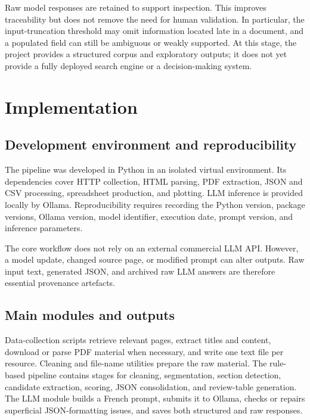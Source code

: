 Raw model responses are retained to support inspection. This improves
traceability but does not remove the need for human validation. In particular,
the input-truncation threshold may omit information located late in a document,
and a populated field can still be ambiguous or weakly supported. At this stage,
the project provides a structured corpus and exploratory outputs; it does not
yet provide a fully deployed search engine or a decision-making system.

\chapter{Implementation}

\section{Development environment and reproducibility}

The pipeline was developed in Python in an isolated virtual environment. Its
dependencies cover HTTP collection, HTML parsing, PDF extraction, JSON and CSV
processing, spreadsheet production, and plotting. LLM inference is provided
locally by Ollama. Reproducibility requires recording the Python version,
package versions, Ollama version, model identifier, execution date, prompt
version, and inference parameters.

The core workflow does not rely on an external commercial LLM API. However, a
model update, changed source page, or modified prompt can alter outputs. Raw
input text, generated JSON, and archived raw LLM answers are therefore essential
provenance artefacts.

\section{Main modules and outputs}

Data-collection scripts retrieve relevant pages, extract titles and content,
download or parse PDF material when necessary, and write one text file per
resource. Cleaning and file-name utilities prepare the raw material. The
rule-based pipeline contains stages for cleaning, segmentation, section
detection, candidate extraction, scoring, JSON consolidation, and review-table
generation. The LLM module builds a French prompt, submits it to Ollama, checks
or repairs superficial JSON-formatting issues, and saves both structured and raw
responses.

